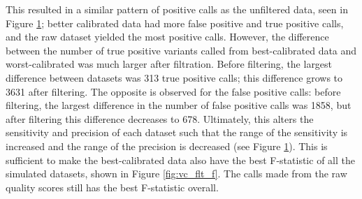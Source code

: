 This resulted in a similar pattern of positive calls as the unfiltered data, seen in Figure \ref{fig:vc_flt_p}; better calibrated data had more false positive and true positive calls, and the raw dataset yielded the most positive calls. However, the difference between the number of true positive variants called from best-calibrated data and worst-calibrated was much larger after filtration. Before filtering, the largest difference between datasets was 313 true positive calls; this difference grows to 3631 after filtering. The opposite is observed for the false positive calls: before filtering, the largest difference in the number of false positive calls was 1858, but after filtering this difference decreases to 678. 
Ultimately, this alters the sensitivity and precision of each dataset such that the range of the sensitivity is increased and the range of the precision is decreased (see Figure \ref{fig:vc_flt_p}). This is sufficient to make the best-calibrated data also have the best F-statistic of all the simulated datasets, shown in Figure \ref{fig:vc_flt_f}. The calls made from the raw quality scores still has the best F-statistic overall.

\begin{figure}
\centering
{}
\label{fig:vc_flt_p}
\end{figure}



